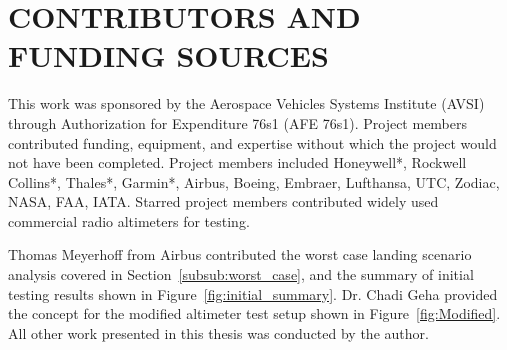 %
%
%
%


\chapter*{CONTRIBUTORS AND FUNDING SOURCES}

This work was sponsored by the Aerospace Vehicles Systems Institute (AVSI) through Authorization for Expenditure 76s1 (AFE 76s1). Project members contributed funding, equipment, and expertise without which the project would not have been completed. Project members included Honeywell*, Rockwell Collins*, Thales*, Garmin*, Airbus, Boeing, Embraer, Lufthansa, UTC, Zodiac, NASA, FAA, IATA. Starred project members contributed widely used commercial radio altimeters for testing.  

Thomas Meyerhoff from Airbus contributed the worst case landing scenario analysis covered in Section~\ref{subsub:worst_case}, and the summary of initial testing results shown in Figure~\ref{fig:initial_summary}. Dr. Chadi Geha provided the concept for the modified altimeter test setup shown in Figure~\ref{fig:Modified}. All other work presented in this thesis was conducted by the author. 

\pagebreak{}